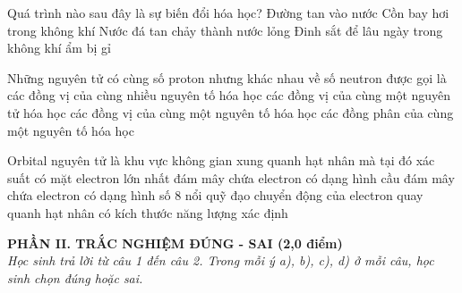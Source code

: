 \documentclass[11pt,a4paper]{article}
\begin{document}
\begin{ex}
Quá trình nào sau đây là sự biến đổi hóa học?
\choice
{Đường tan vào nước}
{Cồn bay hơi trong không khí}
{Nước đá tan chảy thành nước lỏng}
{\True Đinh sắt để lâu ngày trong không khí ẩm bị gỉ}

\end{ex}
\begin{ex}
Những nguyên tử có cùng số proton nhưng khác nhau về số neutron được gọi là
\choice
{các đồng vị của cùng nhiều nguyên tố hóa học}
{các đồng vị của cùng một nguyên tử hóa học}
{\True các đồng vị của cùng một nguyên tố hóa học}
{các đồng phân của cùng một nguyên tố hóa học}

\end{ex}
\begin{ex}
Orbital nguyên tử là
\choice
{\True khu vực không gian xung quanh hạt nhân mà tại đó xác suất có mặt electron lớn nhất}
{đám mây chứa electron có dạng hình cầu}
{đám mây chứa electron có dạng hình số 8 nổi}
{quỹ đạo chuyển động của electron quay quanh hạt nhân có kích thước năng lượng xác định}

\end{ex}
\vspace{4pt}
\noindent
{\color{mainGreen}\textbf{\Large PHẦN II. TRẮC NGHIỆM ĐÚNG - SAI (2,0 điểm)}}\\
\textit{\small Học sinh trả lời từ câu 1 đến câu 2. Trong mỗi ý a), b), c), d) ở mỗi câu, học sinh chọn đúng hoặc sai.}
\vspace{2pt}
\end{document}
